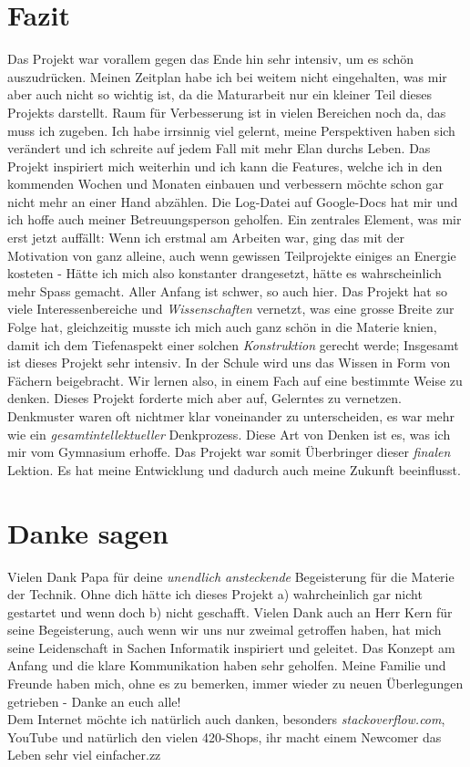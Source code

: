 \documentclass[12pt,titlepage,a4paper]{article}
\begin{document}
\section{Fazit}
Das Projekt war vorallem gegen das Ende hin sehr intensiv, um es schön auszudrücken. Meinen Zeitplan habe ich bei weitem nicht eingehalten, was mir aber auch nicht so wichtig ist, da die Maturarbeit nur ein kleiner Teil dieses Projekts darstellt. Raum für Verbesserung ist in vielen Bereichen noch da, das muss ich zugeben. Ich habe irrsinnig viel gelernt, meine Perspektiven haben sich verändert und ich schreite auf jedem Fall mit mehr Elan durchs Leben. Das Projekt inspiriert mich weiterhin und ich kann die Features, welche ich in den kommenden Wochen und Monaten einbauen und verbessern möchte schon gar nicht mehr an einer Hand abzählen. Die Log-Datei auf Google-Docs hat mir und ich hoffe auch meiner Betreuungsperson geholfen. Ein zentrales Element, was mir erst jetzt auffällt: Wenn ich erstmal am Arbeiten war, ging das mit der Motivation von ganz alleine, auch wenn gewissen Teilprojekte einiges an Energie kosteten - Hätte ich  mich also konstanter drangesetzt, hätte es wahrscheinlich mehr Spass gemacht. Aller Anfang ist schwer, so auch hier. Das Projekt hat so viele Interessenbereiche und \textit{Wissenschaften} vernetzt, was eine grosse Breite zur Folge hat, gleichzeitig musste ich mich auch ganz schön in die Materie knien, damit ich dem Tiefenaspekt einer solchen \textit{Konstruktion} gerecht werde; Insgesamt ist dieses Projekt sehr intensiv. In der Schule wird uns das Wissen in Form von Fächern beigebracht. Wir lernen also, in einem Fach auf eine bestimmte Weise zu denken. Dieses Projekt forderte mich aber auf, Gelerntes zu vernetzen. Denkmuster waren oft nichtmer klar voneinander zu unterscheiden, es war mehr wie ein \textit{gesamtintellektueller} Denkprozess. Diese Art von Denken ist es, was ich mir vom Gymnasium erhoffe. Das Projekt war somit Überbringer dieser \textit{finalen} Lektion. Es hat meine Entwicklung und dadurch auch meine Zukunft beeinflusst.



\section{Danke sagen}
Vielen Dank Papa für deine \textit{unendlich ansteckende} Begeisterung für die Materie der Technik. Ohne dich hätte ich dieses Projekt a) wahrcheinlich gar nicht gestartet und wenn doch b) nicht geschafft. Vielen Dank auch an Herr Kern für seine Begeisterung, auch wenn wir uns nur zweimal getroffen haben, hat mich seine Leidenschaft in Sachen Informatik inspiriert und geleitet. Das Konzept am Anfang und die klare Kommunikation haben sehr geholfen. Meine Familie und Freunde haben mich, ohne es zu bemerken, immer wieder zu neuen Überlegungen getrieben - Danke an euch alle!\\
Dem Internet möchte ich natürlich auch danken, besonders \textit{stackoverflow.com}, YouTube und natürlich den vielen 420-Shops, ihr macht einem Newcomer das Leben sehr viel einfacher.zz



\printglossary[title=Glossar, toctitle=Glossar]



%

\end{document}
